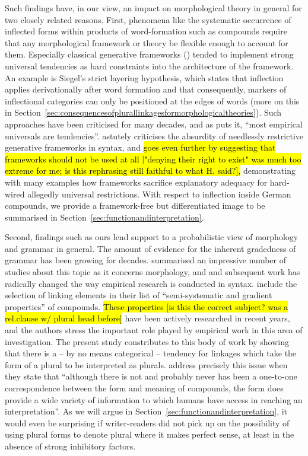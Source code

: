 Such findings have, in our view, an impact on morphological theory in general for two closely related reasons.
First, phenomena like the systematic occurrence of inflected forms within products of word-formation such as compounds require that any morphological framework or theory be flexible enough to account for them.
Especially classical generative frameworks (\egg \citealt{Siegel1979,Mohanan1986,Anderson1992,Pinker1999}) tended to implement strong universal tendencies as hard constraints into the architecture of the framework.
An example is Siegel's strict layering hypothesis, which states that inflection applies derivationally after word formation and that consequently, markers of inflectional categories can only be positioned at the edges of words (more on this in Section~\ref{sec:consequencesofplurallinkagesformorphologicaltheories}).
Such approaches have been criticised for many decades, and as \textcite[391]{Haspelmath2010} puts it, ``most empirical universals are tendencies''.
\textcite{Pollard1996} astutely criticises the absurdity of needlessly restrictive generative frameworks in syntax, and \textcite{Haspelmath2010} \hl{goes even further by suggesting that frameworks should not be used at all ["denying their right to exist" was much too extreme for me; is this rephrasing still faithful to what H. said?],} demonstrating with many examples how frameworks sacrifice explanatory adequacy for hard-wired allegedly universal restrictions.
With respect to inflection inside German compounds, we provide a framework-free but differentiated image to be summarised in Section~\ref{sec:functionandinterpretation}.

Second, findings such as ours lend support to a probabilistic view of morphology and grammar in general.
The amount of evidence for the inherent gradedness of grammar has been growing for decades.
\textcite{HayBaayen2005} summarised an impressive number of studies about this topic as it concerns morphology, and \textcite{Bresnan2007} and subsequent work has radically changed the way empirical research is conducted in syntax.
\textcite[105]{ArndtlappeEa2016} include the selection of linking elements in their list of ``semi-systematic and gradient properties'' of compounds.
\hl{These properties [is this the correct subject? was a rel.clause w/ plural head before]} have been actively researched in recent years, and the authors stress the important role played by empirical work in this area of investigation.
The present study constributes to this body of work by showing that there is a -- by no means categorical -- tendency for linkages which take the form of a plural to be interpreted as plurals.
\textcite[107]{ArndtlappeEa2016} address precisely this issue when they state that ``although there is not and probably never has been a one-to-one correspondence between the form and meaning of compounds, the form does provide a wide variety of information to which humans have access in reaching an interpretation''.
As we will argue in Section~\ref{sec:functionandinterpretation}, it would even be surprising if writer-readers did not pick up on the possibility of using plural forms to denote plural where it makes perfect sense, at least in the absence of strong inhibitory factors.

